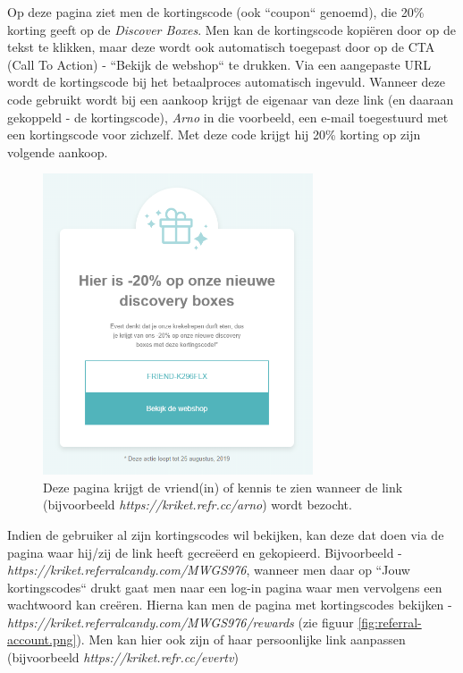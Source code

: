 Op deze pagina ziet men de kortingscode (ook ``coupon`` genoemd), die 20\% korting geeft op de \emph{Discover Boxes}. Men kan de kortingscode kopiëren door op de tekst te klikken, maar deze wordt ook automatisch toegepast door op de CTA (Call To Action) - ``Bekijk de webshop`` te drukken. Via een aangepaste URL wordt de kortingscode bij het betaalproces automatisch ingevuld. Wanneer deze code gebruikt wordt bij een aankoop krijgt de eigenaar van deze link (en daaraan gekoppeld - de kortingscode), \emph{Arno} in die voorbeeld, een e-mail toegestuurd met een kortingscode voor zichzelf. Met deze code krijgt hij 20\% korting op zijn volgende aankoop.

\begin{figure}[h!]
	\includegraphics[width=80mm,scale=0.7]{img/referral-share-page.png}
	\centering
	\caption{Deze pagina krijgt de vriend(in) of kennis te zien wanneer de link (bijvoorbeeld \emph{https://kriket.refr.cc/arno}) wordt bezocht.}
	\label{fig:referral-share-page}
\end{figure}

Indien de gebruiker al zijn kortingscodes wil bekijken, kan deze dat doen via de pagina waar hij/zij de link heeft gecreëerd en gekopieerd. Bijvoorbeeld - \emph{https://kriket.referralcandy.com/MWGS976}, wanneer men daar op ``Jouw kortingscodes`` drukt gaat men naar een log-in pagina waar men vervolgens een wachtwoord kan creëren. Hierna kan men de pagina met kortingscodes bekijken - \emph{https://kriket.referralcandy.com/MWGS976/rewards} (zie figuur \ref{fig:referral-account.png}). Men kan hier ook zijn of haar persoonlijke link aanpassen (bijvoorbeeld \emph{https://kriket.refr.cc/evertv})

